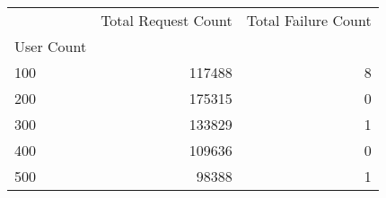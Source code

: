 \begin{tabular}{lrr}
\toprule
 & Total Request Count & Total Failure Count \\
User Count &  &  \\
\midrule
100 & 117488 & 8 \\
200 & 175315 & 0 \\
300 & 133829 & 1 \\
400 & 109636 & 0 \\
500 & 98388 & 1 \\
\bottomrule
\end{tabular}
